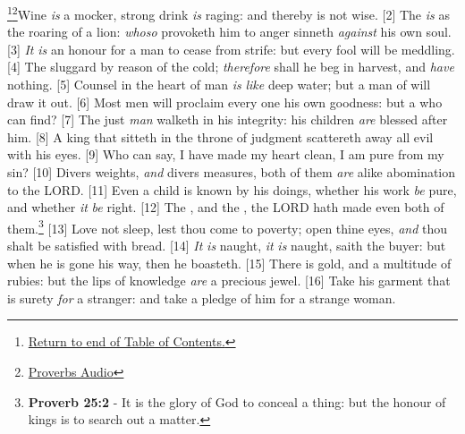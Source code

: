 \footnote{\textcolor[cmyk]{0.99998,1,0,0}{\hyperlink{TOC}{Return to end of Table of Contents.}}}\footnote{\href{https://audiobible.com/bible/proverbs_20.html}{\textcolor[cmyk]{0.99998,1,0,0}{Proverbs Audio}}}\textcolor[cmyk]{0.99998,1,0,0}{Wine \emph{is} a mocker, strong drink \emph{is} raging: and  thereby is not wise.}
[2] \textcolor[cmyk]{0.99998,1,0,0}{The  \emph{is} as the roaring of a lion: \emph{whoso} provoketh him to anger sinneth \emph{against} his own soul.}
[3] \textcolor[cmyk]{0.99998,1,0,0}{\emph{It} \emph{is} an honour for a man to cease from strife: but every fool will be meddling.}
[4] \textcolor[cmyk]{0.99998,1,0,0}{The sluggard  by reason of the cold; \emph{therefore} shall he beg in harvest, and \emph{have} nothing.}
[5] \textcolor[cmyk]{0.99998,1,0,0}{Counsel in the heart of man \emph{is} \emph{like} deep water; but a man of  will draw it out.}
[6] \textcolor[cmyk]{0.99998,1,0,0}{Most men will proclaim every one his own goodness: but a  who can find?}
[7] \textcolor[cmyk]{0.99998,1,0,0}{The just \emph{man} walketh in his integrity: his children \emph{are} blessed after him.}
[8] \textcolor[cmyk]{0.99998,1,0,0}{A king that sitteth in the throne of judgment scattereth away all evil with his eyes.}
[9] \textcolor[cmyk]{0.99998,1,0,0}{Who can say, I have made my heart clean, I am pure from my sin?}
[10] \textcolor[cmyk]{0.99998,1,0,0}{Divers weights, \emph{and} divers measures, both of them \emph{are} alike abomination to the LORD.}
[11] \textcolor[cmyk]{0.99998,1,0,0}{Even a child is known by his doings, whether his work \emph{be} pure, and whether \emph{it} \emph{be} right.}
[12] \textcolor[cmyk]{0.99998,1,0,0}{The , and the , the LORD hath made even both of them.}\footnote{\textbf{Proverb 25:2} - It is the glory of God to conceal a thing: but the honour of kings is to search out a matter.}
[13] \textcolor[cmyk]{0.99998,1,0,0}{Love not sleep, lest thou come to poverty; open thine eyes, \emph{and} thou shalt be satisfied with bread.}
[14] \textcolor[cmyk]{0.99998,1,0,0}{\emph{It} \emph{is} naught, \emph{it} \emph{is} naught, saith the buyer: but when he is gone his way, then he boasteth.}
[15] \textcolor[cmyk]{0.99998,1,0,0}{There is gold, and a multitude of rubies: but the lips of knowledge \emph{are} a precious jewel.}
[16] \textcolor[cmyk]{0.99998,1,0,0}{Take his garment that is surety \emph{for} a stranger: and take a pledge of him for a strange woman.}

